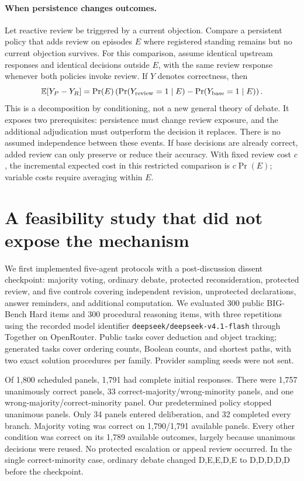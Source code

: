 \documentclass[sigconf,anonymous]{aamas}
\begin{document}
\paragraph{When persistence changes outcomes.}
Let reactive review be triggered by a current objection. Compare a persistent policy that adds review on episodes $E$ where registered standing remains but no current objection survives. For this comparison, assume identical upstream responses and identical decisions outside $E$, with the same review response whenever both policies invoke review. If $Y$ denotes correctness, then
\begin{equation}
\mathbb{E}[Y_P-Y_R]=\Pr(E)\left(\Pr(Y_{\rm review}=1\mid E)-\Pr(Y_{\rm base}=1\mid E)\right).
\end{equation}
This is a decomposition by conditioning, not a new general theory of debate. It exposes two prerequisites: persistence must change review exposure, and the additional adjudication must outperform the decision it replaces. There is no assumed independence between these events. If base decisions are already correct, added review can only preserve or reduce their accuracy. With fixed review cost $c$, the incremental expected cost in this restricted comparison is $c\Pr(E)$; variable costs require averaging within $E$.

\section{A feasibility study that did not expose the mechanism}
We first implemented five-agent protocols with a post-discussion dissent checkpoint: majority voting, ordinary debate, protected reconsideration, protected review, and five controls covering independent revision, unprotected declarations, answer reminders, and additional computation. We evaluated 300 public BIG-Bench Hard items\cite{suzgun2022} and 300 procedural reasoning items, with three repetitions using the recorded model identifier \texttt{deepseek/deepseek-v4.1-flash} through Together on OpenRouter. Public tasks cover deduction and object tracking; generated tasks cover ordering counts, Boolean counts, and shortest paths, with two exact solution procedures per family. Provider sampling seeds were not sent.

Of 1,800 scheduled panels, 1,791 had complete initial responses. There were 1,757 unanimously correct panels, 33 correct-majority/wrong-minority panels, and one wrong-majority/correct-minority panel. Our predetermined policy stopped unanimous panels. Only 34 panels entered deliberation, and 32 completed every branch. Majority voting was correct on 1,790/1,791 available panels. Every other condition was correct on its 1,789 available outcomes, largely because unanimous decisions were reused. No protected escalation or appeal review occurred. In the single correct-minority case, ordinary debate changed D,E,E,D,E to D,D,D,D,D before the checkpoint.
\end{document}
